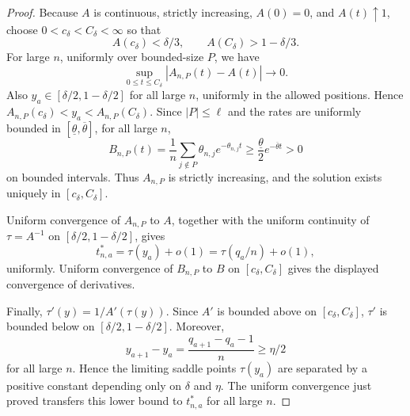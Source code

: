 \documentclass[11pt]{article}
\theoremstyle{remark}
\begin{document}
\begin{proof}
Because \(A\) is continuous, strictly increasing, \(A(0)=0\), and \(A(t)\uparrow1\), choose \(0<c_\delta<C_\delta<\infty\) so that
\[
        A(c_\delta)<\delta/3,
        \qquad
        A(C_\delta)>1-\delta/3 .
\]
For large \(n\), uniformly over bounded-size \(P\), we have
\[
        \sup_{0\le t\le C_\delta}|A_{n,P}(t)-A(t)|\to0.
\]
Also \(y_a\in[\delta/2,1-\delta/2]\) for all large \(n\), uniformly in the allowed positions.  Hence \(A_{n,P}(c_\delta)<y_a<A_{n,P}(C_\delta)\).  Since \(|P|\le\ell\) and the rates are uniformly bounded in \([\underline\theta,\overline\theta]\), for all large \(n\),
\[
        B_{n,P}(t)
        =\frac1n\sum_{j\notin P}\theta_{n,j}e^{-\theta_{n,j}t}
        \ge \frac{\underline\theta}{2}e^{-\overline\theta t}>0
\]
on bounded intervals.  Thus \(A_{n,P}\) is strictly increasing, and the solution exists uniquely in \([c_\delta,C_\delta]\).

Uniform convergence of \(A_{n,P}\) to \(A\), together with the uniform continuity of \(\tau=A^{-1}\) on \([\delta/2,1-\delta/2]\), gives
\[
        t_{n,a}^*=\tau(y_a)+o(1)=\tau(q_a/n)+o(1),
\]uniformly.  Uniform convergence of \(B_{n,P}\) to \(B\) on \([c_\delta,C_\delta]\) gives the displayed convergence of derivatives.

Finally, \(\tau'(y)=1/A'(\tau(y))\).  Since \(A'\) is bounded above on \([c_\delta,C_\delta]\), \(\tau'\) is bounded below on \([\delta/2,1-\delta/2]\).  Moreover,
\[
        y_{a+1}-y_a=\frac{q_{a+1}-q_a-1}{n}\ge \eta/2
\]
for all large \(n\).  Hence the limiting saddle points \(\tau(y_a)\) are separated by a positive constant depending only on \(\delta\) and \(\eta\).  The uniform convergence just proved transfers this lower bound to \(t_{n,a}^*\) for all large \(n\).
\end{proof}
\end{document}
